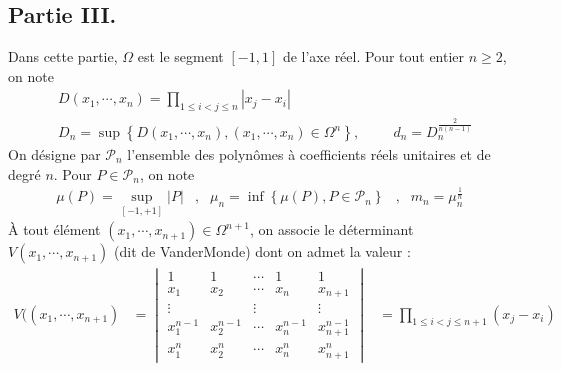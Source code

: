\subsection*{Partie III.}
Dans cette partie, $\Omega$ est le segment $[-1,1]$ de l'axe réel. Pour tout entier $n\geq 2$, on note
\begin{align*}
 &D(x_1,\cdots,x_n) =\prod_{1\leq i < j \leq n}|x_j - x_i| \\
 &D_n = \sup \left\lbrace D(x_1,\cdots,x_n) , (x_1,\cdots,x_n)\in \Omega ^n\right\rbrace, \hspace{1cm}
d_n = D_n^{\frac{2}{n(n-1)}}
\end{align*}
On désigne par $\mathcal P_n$ l'ensemble des polynômes à coefficients réels unitaires et de degré $n$. Pour $P\in \mathcal P_n$, on note
\begin{align*}
 \mu (P) = \sup_{[-1,+1]}|P| &,& \mu_n = \inf \left\lbrace \mu(P), P\in \mathcal P_n \right\rbrace &,& m_n = \mu_n^{\frac{1}{n}}
\end{align*}
\`A tout élément $(x_1,\cdots,x_{n+1})\in \Omega^{n+1}$, on associe le déterminant $V(x_1,\cdots,x_{n+1})$ (dit de VanderMonde) dont on admet la valeur :
\begin{align*}
 V((x_1,\cdots,x_{n+1})&=
 \begin{vmatrix}
  1 & 1 & \cdots & 1 & 1 \\
x_1 & x_2 & \cdots & x_n & x_{n+1} \\
\vdots & & \vdots &  & \vdots \\
 x_1^{n-1} & x_2^{n-1} & \cdots & x_n^{n-1} & x_{n+1}^{n-1} \\
 x_1^{n} & x_2^{n} & \cdots & x_n^{n} & x_{n+1}^{n}
 \end{vmatrix} 
&= \prod_{1\leq i < j \leq n+1} (x_j - x_i)
\end{align*}

